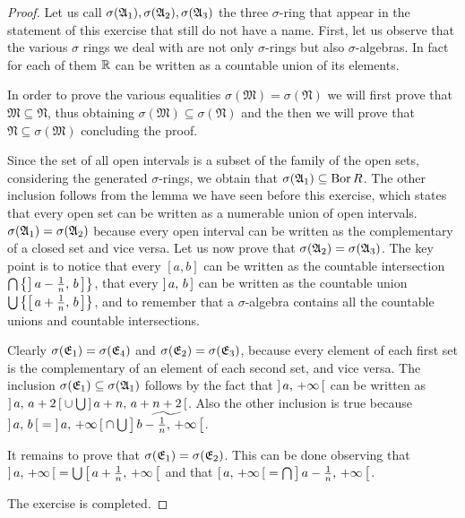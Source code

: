 \documentclass[../EserciziIstituzioniAnalisi.tex]{subfiles}
\begin{document}
\begin{proof}
  Let us call $\sigma({\mathfrak A_1}), \sigma({\mathfrak A_2}), \sigma({\mathfrak A_3})$ the three $\sigma$-ring that appear in the statement of this exercise that still do not have a name.
  First, let us observe that the various $\sigma$ rings we deal with are not only $\sigma$-rings but also $\sigma$-algebras.
  In fact for each of them $\mathbb R$ can be written as a countable union of its elements.

  In order to prove the various equalities $\sigma(\mathfrak{M}) = \sigma(\mathfrak{N})$ we will first prove that $\mathfrak{M} \subseteq \mathfrak{N}$, thus obtaining $\sigma(\mathfrak{M}) \subseteq \sigma(\mathfrak{N})$ and the then we will prove that $\mathfrak{N} \subseteq \sigma(\mathfrak{M})$ concluding the proof.

  Since the set of all open intervals is a subset of the family of the open sets, considering the generated $\sigma$-rings, we obtain that $\sigma(\mathfrak A_1) \subseteq \operatorname{Bor}{R}$. 
  The other inclusion follows from the lemma we have seen before this exercise, which states that every open set can be written as a numerable union of open intervals.
  $\sigma(\mathfrak A_1) = \sigma(\mathfrak A_2)$ because every open interval can be written as the complementary of a closed set and vice versa.
  Let us now prove that $\sigma(\mathfrak A_2) = \sigma(\mathfrak A_3)$.
  The key point is to notice that every $[a,b]$ can be written as the countable intersection $\bigcap \left\lbrace \left]\,a-\frac{1}{n},\,b\,\right]\right\rbrace$, that every $\left]\,a,\,b\,\right]$ can be written as the countable union $\bigcup \left\lbrace \left[\,a+\frac{1}{n},\,b\,\right]\right\rbrace$, and to remember that a $\sigma$-algebra contains all the countable unions and countable intersections.

  Clearly $\sigma(\mathfrak E_1) = \sigma(\mathfrak E_4)$ and $\sigma(\mathfrak E_2) = \sigma(\mathfrak E_3)$, because every element of each first set is the complementary of an element of each second set, and vice versa.
  The inclusion $\sigma(\mathfrak E_1) \subseteq \sigma(\mathfrak A_1)$ follows by the fact that $\left]\,a,\,+\infty\,\right[$ can be written as $\left]\,a,\,a + 2\,\right[ \cup \bigcup \left]\,a+n,\,a+n+2\,\right[$. 
  Also the other inclusion is true because $\left]\,a,\,b\,\right[ = \left]\,a,\,+\infty\,\right[ \cap \bigcup \widetilde{\left]\,b-\frac{1}{n},\,+\infty\,\right[}$.

It remains to prove that $\sigma(\mathfrak E_1) = \sigma(\mathfrak E_2)$. 
This can be done observing that $\left]\,a,\,+\infty\,\right[ = \bigcup \left[\,a+\frac{1}{n},\,+\infty\,\right[$ and that $\left[\,a,\,+\infty\,\right[ = \bigcap \left]\,a-\frac{1}{n},\,+\infty\,\right[$.

The exercise is completed.
\end{proof}
\end{document}

